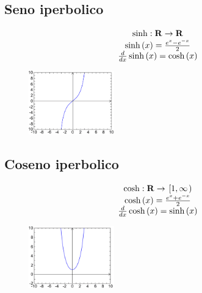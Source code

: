 \documentclass{report}
\begin{document}
    \subsection{Seno iperbolico}
        $$\begin{array}{c}
            \sinh: \mathbf{R} \rightarrow \mathbf{R} \\
            \sinh\left(x\right) = \frac{e^x-e^{-x}}{2} \\
            \D{x}\sinh\left(x\right) = \cosh\left(x\right)
        \end{array}$$
        \begin{center}
            \begin{figure}[H]
                \includegraphics[width = 0.33\textwidth]{sinh.png}
            \end{figure}
        \end{center}
    \subsection{Coseno iperbolico}
        $$\begin{array}{c}
            \cosh: \mathbf{R} \rightarrow \left.\left[1, \infty\right.\right) \\
            \cosh\left(x\right) = \frac{e^x+e^{-x}}{2} \\
            \D{x}\cosh\left(x\right) = \sinh\left(x\right)
        \end{array}$$
        \begin{center}
            \begin{figure}[H]
                \includegraphics[width = 0.33\textwidth]{cosh.png}
            \end{figure}
        \end{center}
\end{document}
